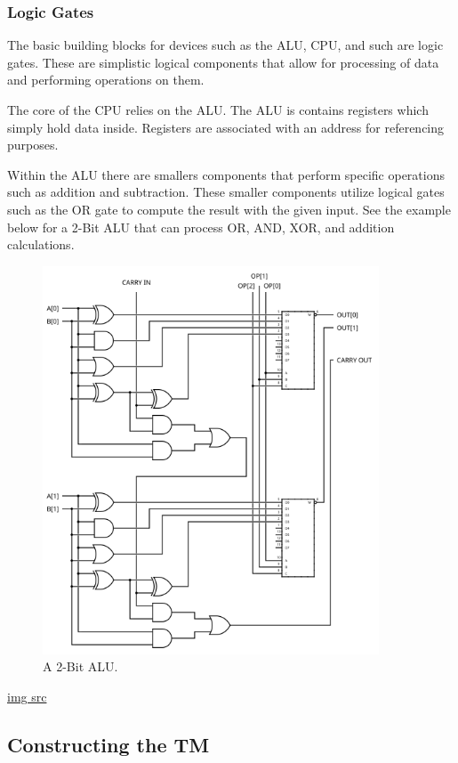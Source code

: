 \subsubsection{Logic Gates}\label{subsec:LogicGates}

The basic building blocks for devices such as the ALU, CPU, and such are logic gates.
These are simplistic logical components that allow for processing of data and performing operations on them.

The core of the CPU relies on the ALU.
The ALU is contains registers which simply hold data inside.
Registers are associated with an address for referencing purposes.

Within the ALU there are smallers components that perform specific operations such as addition and subtraction.
These smaller components utilize logical gates such as the OR gate to compute the result with the given input.
See the example below for a 2-Bit ALU that can process OR, AND, XOR, and addition calculations.

\begin{figure}[htb]
    \centering
    \includegraphics[width=10cm]{Images/2-bit_ALU.svg.png}
       \caption{A 2-Bit ALU.}
           \label{Fig:2BitALU}
\end{figure}

\href{https://en.wikibooks.org/wiki/File:2-bit_ALU.svg}{img src}

\subsection{Constructing the TM}\label{subsec:CreateTM}


